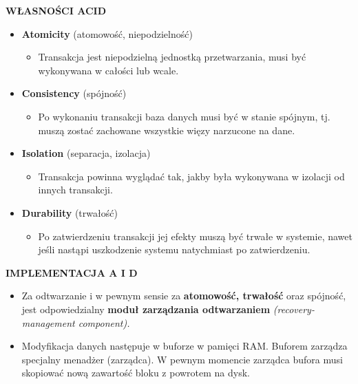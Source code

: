 \documentclass[a5paper,6pt]{article}
\begin{document}
    \textbf{WŁASNOŚCI ACID}
    \begin{itemize}
        \item \textbf{Atomicity} (atomowość, niepodzielność)
        \begin{itemize}
            \item Transakcja jest niepodzielną jednostką przetwarzania, musi
                  być wykonywana w całości lub wcale.
        \end{itemize}

        \item \textbf{Consistency} (spójność)
        \begin{itemize}
            \item Po wykonaniu transakcji baza danych musi być w stanie spójnym,
                  tj. muszą zostać zachowane wszystkie więzy narzucone na dane.
        \end{itemize}

        \item \textbf{Isolation} (separacja, izolacja)
        \begin{itemize}
            \item Transakcja powinna wyglądać tak, jakby była wykonywana w
                  izolacji od innych transakcji.
        \end{itemize}

        \item \textbf{Durability} (trwałość)
        \begin{itemize}
            \item Po zatwierdzeniu transakcji jej efekty muszą być trwałe w
                  systemie, nawet jeśli nastąpi uszkodzenie systemu natychmiast
                  po zatwierdzeniu.
        \end{itemize}

    \end{itemize}

    \textbf{IMPLEMENTACJA A I D}
    \begin{itemize}
        \item Za odtwarzanie i w pewnym sensie za \textbf{atomowość, trwałość}
              oraz spójność, jest odpowiedzialny \textbf{moduł zarządzania
              odtwarzaniem} \textit{(recovery-management component).}

        \item Modyfikacja danych następuje w buforze w pamięci RAM. Buforem
              zarządza specjalny menadżer (zarządca). W pewnym momencie zarządca
              bufora musi skopiować nową zawartość bloku z powrotem na dysk.
    \end{itemize}
\end{document}
